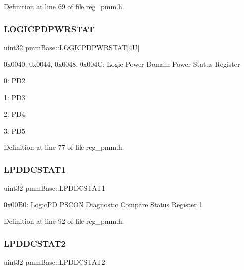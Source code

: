 Definition at line 69 of file reg\+\_\+pmm.\+h.

\mbox{\label{structpmmBase_afebfb1038a676cca54d8545cd0b93041}} 
\subsubsection{\texorpdfstring{L\+O\+G\+I\+C\+P\+D\+P\+W\+R\+S\+T\+AT}{LOGICPDPWRSTAT}}
{\footnotesize\ttfamily uint32 pmm\+Base\+::\+L\+O\+G\+I\+C\+P\+D\+P\+W\+R\+S\+T\+AT\mbox{[}4\+U\mbox{]}}

0x0040, 0x0044, 0x0048, 0x004C\+: Logic Power Domain Power Status Register
\begin{DoxyItemize}
\item 0\+: P\+D2
\item 1\+: P\+D3
\item 2\+: P\+D4
\item 3\+: P\+D5 
\end{DoxyItemize}

Definition at line 77 of file reg\+\_\+pmm.\+h.

\mbox{\label{structpmmBase_a4e5041e019a31b82ba4c61abbb6a166f}} 
\subsubsection{\texorpdfstring{L\+P\+D\+D\+C\+S\+T\+A\+T1}{LPDDCSTAT1}}
{\footnotesize\ttfamily uint32 pmm\+Base\+::\+L\+P\+D\+D\+C\+S\+T\+A\+T1}

0x00\+B0\+: Logic\+PD P\+S\+C\+ON Diagnostic Compare Status Register 1 

Definition at line 92 of file reg\+\_\+pmm.\+h.

\mbox{\label{structpmmBase_afe50e574ee38ad8af75f140d32fb33b4}} 
\subsubsection{\texorpdfstring{L\+P\+D\+D\+C\+S\+T\+A\+T2}{LPDDCSTAT2}}
{\footnotesize\ttfamily uint32 pmm\+Base\+::\+L\+P\+D\+D\+C\+S\+T\+A\+T2}

